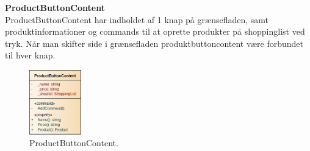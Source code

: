 \textbf{ProductButtonContent} \\
ProductButtonContent har indholdet af 1 knap på grænsefladen, samt produktinformationer og commands til at oprette produkter på shoppinglist ved tryk. Når man skifter side i grænsefladen produktbuttoncontent være forbundet til hver knap.

\begin{figure}[H]
	\centering
	\includegraphics[width=0.2\textwidth]{Systemdesign/Frontend/pics/ProductButtonContent}
	\caption{ProductButtonContent.}
	\label{fig:PBCon}
\end{figure}